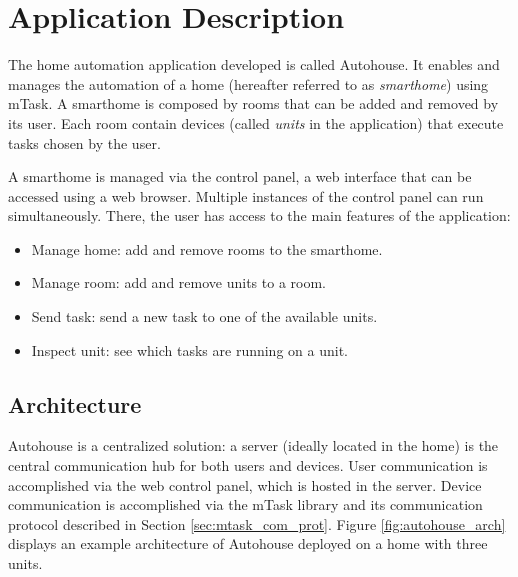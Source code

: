 \section{Application Description}\label{sec:app_desc}

The home automation application developed is called Autohouse. It enables and manages the automation of a home (hereafter referred to as \textit{smarthome}) using \gls{mTask}. A smarthome is composed by rooms that can be added and removed by its user. Each room contain devices (called \textit{units} in the application) that execute tasks chosen by the user. 

A smarthome is managed via the control panel, a web interface that can be accessed using a web browser. Multiple instances of the control panel can run simultaneously. There, the user has access to the main features of the application:

\begin{itemize}
    \item Manage home: add and remove rooms to the smarthome.
    \item Manage room: add and remove units to a room.
    \item Send task: send a new task to one of the available units.
    \item Inspect unit: see which tasks are running on a unit.
\end{itemize}

\subsection{Architecture}

Autohouse is a centralized solution: a server (ideally located in the home) is the central communication hub for both users and devices. User communication is accomplished via the web control panel, which is hosted in the server. Device communication is accomplished via the \gls{mTask} library and its communication protocol described in Section \ref{sec:mtask_com_prot}. Figure \ref{fig:autohouse_arch} displays an example architecture of Autohouse deployed on a home with three units. 

